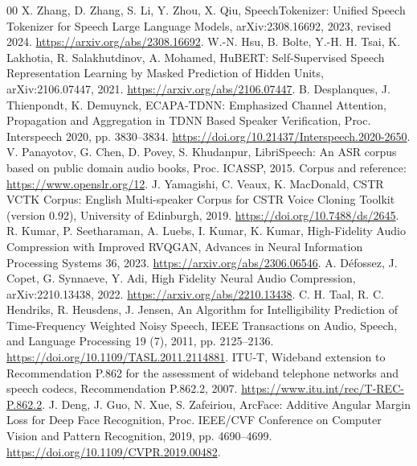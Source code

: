\documentclass[final,5p,times,twocolumn]{elsarticle}
\begin{document}
\begin{thebibliography}{00}
X. Zhang, D. Zhang, S. Li, Y. Zhou, X. Qiu,
SpeechTokenizer: Unified Speech Tokenizer for Speech Large Language Models,
arXiv:2308.16692, 2023, revised 2024.
\url{https://arxiv.org/abs/2308.16692}.
W.-N. Hsu, B. Bolte, Y.-H. H. Tsai, K. Lakhotia, R. Salakhutdinov, A. Mohamed,
HuBERT: Self-Supervised Speech Representation Learning by Masked Prediction of Hidden Units,
arXiv:2106.07447, 2021.
\url{https://arxiv.org/abs/2106.07447}.
B. Desplanques, J. Thienpondt, K. Demuynck,
ECAPA-TDNN: Emphasized Channel Attention, Propagation and Aggregation in TDNN Based Speaker Verification,
Proc. Interspeech 2020, pp. 3830--3834.
\url{https://doi.org/10.21437/Interspeech.2020-2650}.
V. Panayotov, G. Chen, D. Povey, S. Khudanpur,
LibriSpeech: An ASR corpus based on public domain audio books,
Proc. ICASSP, 2015. Corpus and reference:
\url{https://www.openslr.org/12}.
J. Yamagishi, C. Veaux, K. MacDonald,
CSTR VCTK Corpus: English Multi-speaker Corpus for CSTR Voice Cloning Toolkit (version 0.92),
University of Edinburgh, 2019.
\url{https://doi.org/10.7488/ds/2645}.
R. Kumar, P. Seetharaman, A. Luebs, I. Kumar, K. Kumar,
High-Fidelity Audio Compression with Improved RVQGAN,
Advances in Neural Information Processing Systems 36, 2023.
\url{https://arxiv.org/abs/2306.06546}.
A. D\'efossez, J. Copet, G. Synnaeve, Y. Adi,
High Fidelity Neural Audio Compression,
arXiv:2210.13438, 2022.
\url{https://arxiv.org/abs/2210.13438}.
C. H. Taal, R. C. Hendriks, R. Heusdens, J. Jensen,
An Algorithm for Intelligibility Prediction of Time-Frequency Weighted Noisy Speech,
IEEE Transactions on Audio, Speech, and Language Processing 19 (7), 2011, pp. 2125--2136.
\url{https://doi.org/10.1109/TASL.2011.2114881}.
ITU-T, Wideband extension to Recommendation P.862 for the assessment of wideband telephone networks and speech codecs,
Recommendation P.862.2, 2007.
\url{https://www.itu.int/rec/T-REC-P.862.2}.
J. Deng, J. Guo, N. Xue, S. Zafeiriou,
ArcFace: Additive Angular Margin Loss for Deep Face Recognition,
Proc. IEEE/CVF Conference on Computer Vision and Pattern Recognition, 2019, pp. 4690--4699.
\url{https://doi.org/10.1109/CVPR.2019.00482}.
\end{thebibliography}
\end{document}
